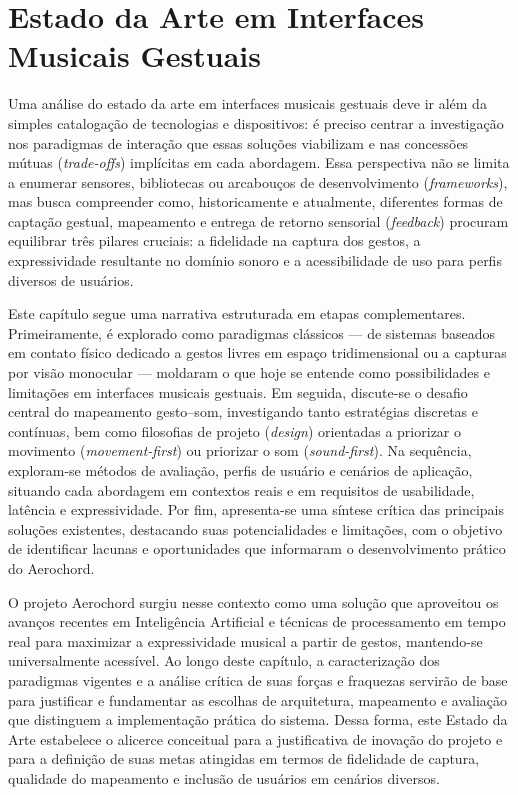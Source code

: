 \chapter{Estado da Arte em Interfaces Musicais Gestuais}
\label{cap:analise_estado_arte_interfaces_musicais_gestuais}

Uma análise do estado da arte em interfaces musicais gestuais deve ir além da simples catalogação de tecnologias e dispositivos: é preciso centrar a investigação nos paradigmas de interação que essas soluções viabilizam e nas concessões mútuas (\textit{trade-offs}) implícitas em cada abordagem. Essa perspectiva não se limita a enumerar sensores, bibliotecas ou arcabouços de desenvolvimento (\textit{frameworks}), mas busca compreender como, historicamente e atualmente, diferentes formas de captação gestual, mapeamento e entrega de retorno sensorial (\textit{feedback}) procuram equilibrar três pilares cruciais: a fidelidade na captura dos gestos, a expressividade resultante no domínio sonoro e a acessibilidade de uso para perfis diversos de usuários.

Este capítulo segue uma narrativa estruturada em etapas complementares. Primeiramente, é explorado como paradigmas clássicos — de sistemas baseados em contato físico dedicado a gestos livres em espaço tridimensional ou a capturas por visão monocular — moldaram o que hoje se entende como possibilidades e limitações em interfaces musicais gestuais. Em seguida, discute-se o desafio central do mapeamento gesto–som, investigando tanto estratégias discretas e contínuas, bem como filosofias de projeto (\textit{design}) orientadas a priorizar o movimento (\textit{movement-first}) ou priorizar o som (\textit{sound-first}). Na sequência, exploram-se métodos de avaliação, perfis de usuário e cenários de aplicação, situando cada abordagem em contextos reais e em requisitos de usabilidade, latência e expressividade. Por fim, apresenta-se uma síntese crítica das principais soluções existentes, destacando suas potencialidades e limitações, com o objetivo de identificar lacunas e oportunidades que informaram o desenvolvimento prático do Aerochord.

O projeto Aerochord surgiu nesse contexto como uma solução que aproveitou os avanços recentes em Inteligência Artificial e técnicas de processamento em tempo real para maximizar a expressividade musical a partir de gestos, mantendo-se universalmente acessível. Ao longo deste capítulo, a caracterização dos paradigmas vigentes e a análise crítica de suas forças e fraquezas servirão de base para justificar e fundamentar as escolhas de arquitetura, mapeamento e avaliação que distinguem a implementação prática do sistema. Dessa forma, este Estado da Arte estabelece o alicerce conceitual para a justificativa de inovação do projeto e para a definição de suas metas atingidas em termos de fidelidade de captura, qualidade do mapeamento e inclusão de usuários em cenários diversos.

